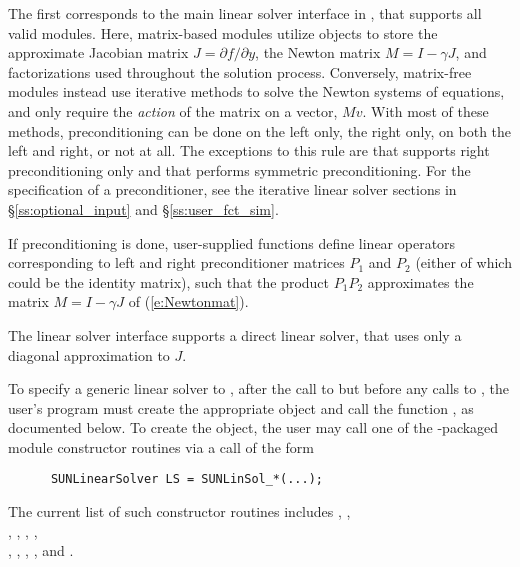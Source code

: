 The first corresponds to the main linear solver interface in {\cvode},
that supports all valid {\sunlinsol} modules.  Here, matrix-based
{\sunlinsol} modules utilize {\sunmatrix} objects to store the
approximate Jacobian matrix $J = \partial{f}/\partial{y}$, the Newton
matrix $M = I-\gamma J$, and factorizations used throughout the
solution process.  Conversely, matrix-free {\sunlinsol} modules
instead use iterative methods to solve the Newton systems of
equations, and only require the \emph{action} of the matrix on a
vector, $Mv$.  With most of these methods, preconditioning can be done
on the left only, the right only, on both the left and right, or not
at all.  The exceptions to this rule are {\spfgmr} that supports right
preconditioning only and {\pcg} that performs symmetric
preconditioning.  For the specification of a preconditioner, see the
iterative linear solver sections in \S\ref{ss:optional_input} and
\S\ref{ss:user_fct_sim}.

If preconditioning is done, user-supplied functions define linear
operators corresponding to left and right preconditioner matrices
$P_1$ and $P_2$ (either of which could be the identity matrix), such
that the product $P_1 P_2$ approximates the matrix $M = I - \gamma J$
of (\ref{e:Newtonmat}).

The {\cvdiag} linear solver interface supports a direct linear solver,
that uses only a diagonal approximation to $J$.


To specify a generic linear solver to {\cvode}, after the call to
 but before any calls to , the user's
program must create the appropriate  object and call
the function , as documented below.
To create the  object, the user may call one of
the {\sundials}-packaged {\sunlinsol} module constructor routines via
a call of the form

\begin{verbatim}
      SUNLinearSolver LS = SUNLinSol_*(...);
\end{verbatim}

The current list of such constructor routines includes
,
, \\ \noindent
{},
,
,
, \\ \noindent
{},
,
,
, and
.

